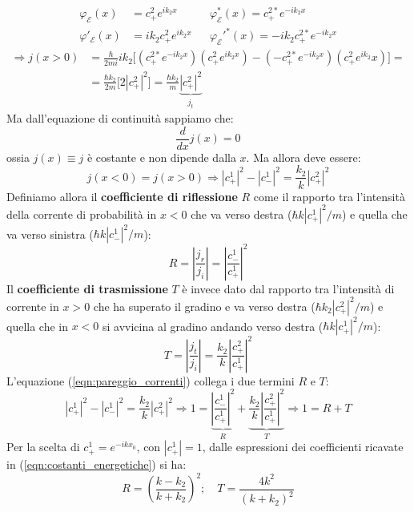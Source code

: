 \documentclass[../../FisicaTeorica.tex]{subfiles}
\begin{document}
\begin{align*}
\varphi_\mathcal{E}(x)&=c^2_+ e^{ik_2x} && \varphi_\mathcal{E}^*(x)=c^{2*}_+e^{-ik_2x}\\
\varphi'_\mathcal{E}(x)&=ik_2 c^2_+ e^{ik_2 x} && \varphi_\mathcal{E}'^*(x)=-ik_2 c^{2*}_+ e^{-ik_2 x}
\end{align*}
\begin{align*}
\Rightarrow j(x>0)&=\frac{\hbar}{2mi}ik_2\big[(c^{2*}_+ e^{-ik_2 x})(c^2_+ e^{ik_2 x})-(-c^{2*}_+e^{-ik_2 x})(c^2_+ e^{ik_2}x)\big] =\\
&=\frac{\hbar k_2}{2m}\big[2 |c^2_+|^2\big] = \frac{\hbar k_2}{m}\underbrace{|c^2_+|^2}_{j_t}
\end{align*}
Ma dall'equazione di continuità sappiamo che:
\[
\frac{d}{dx}j(x)=0
\]
ossia $j(x) \equiv j$ è costante e non dipende dalla $x$. Ma allora deve essere:
\begin{equation}
j(x<0)=j(x>0) \Rightarrow  |c^1_+|^2-|c^1_-|^2=\frac{k_2}{k}|c^2_+|^2
\label{eqn:pareggio_correnti}
\end{equation}
Definiamo allora il \textbf{coefficiente di riflessione} $R$ come il rapporto tra l'intensità della corrente di probabilità in $x<0$ che va verso destra ($\hbar k |c^1_+|^2/m$) e quella che va verso sinistra ($\hbar k |c^1_-|^2/m$):
\[
R=\left| \frac{j_r}{j_i} \right |=\left | \frac{c^1_-}{c^1_+}\right |^2
\]
Il \textbf{coefficiente di trasmissione} $T$ è invece dato dal rapporto tra l'intensità di corrente in $x>0$ che ha superato il gradino e va verso destra ($\hbar k_2 |c^2_+|^2/m$) e quella che in $x<0$ si avvicina al gradino andando verso destra ($\hbar k |c^1_+|^2/m$):
\[
T=\left | \frac{j_t}{j_i} \right |
=\frac{k_2}{k}\left | \frac{c^2_+}{c^1_+}\right |^2
\]
L'equazione (\ref{eqn:pareggio_correnti}) collega i due termini $R$ e $T$:
\[
|c^1_+|^2 - |c^1_-|^2 = \frac{k_2}{k}
|c^2_+|^2 \Rightarrow 1=
\underbrace{\left |\frac{c^1_-}{c^1_+}\right |^2}_{R} +
\underbrace{\frac{k_2}{k}\left | \frac{c^2_+}{c^1_+}\right |^2}_{T} \Rightarrow 1=R+T
\]
Per la scelta di $c^1_+=e^{-ikx_0}$, con $|c^1_+|=1$, dalle espressioni dei coefficienti ricavate in (\ref{eqn:costanti_energetiche}) si ha:
\[
R=\left(\frac{k-k_2}{k+k_2}\right)^2;\quad T=
\frac{4k^2}{(k+k_2)^2}
\]
\end{document}
